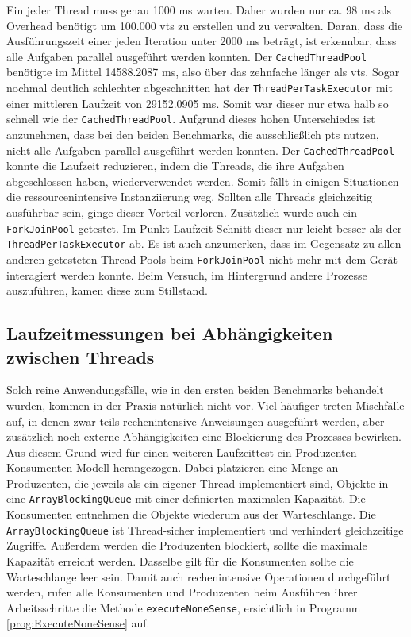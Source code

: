     Ein jeder Thread muss genau
    1000 ms warten. Daher wurden nur ca. 98 ms als Overhead benötigt um 100.000 \Glspl{vt} zu erstellen und zu verwalten. Daran, dass die Ausführungszeit einer jeden Iteration unter 2000 ms beträgt, ist
    erkennbar, dass alle Aufgaben parallel ausgeführt werden konnten.
    Der \texttt{CachedThreadPool} benötigte im Mittel 14588.2087 ms, also über das zehnfache länger als \Glspl{vt}.
    Sogar nochmal deutlich schlechter abgeschnitten hat der \texttt{ThreadPerTaskExecutor} mit einer mittleren Laufzeit von 29152.0905 ms. Somit war dieser nur etwa halb so schnell wie
    der \texttt{CachedThreadPool}. Aufgrund dieses hohen Unterschiedes ist anzunehmen, dass bei den beiden Benchmarks, die ausschließlich \Glspl{pt} nutzen, nicht alle Aufgaben parallel ausgeführt
    werden konnten. Der \texttt{CachedThreadPool} konnte die Laufzeit reduzieren, indem die Threads, die ihre Aufgaben abgeschlossen haben, wiederverwendet werden. Somit fällt in einigen Situationen 
    die ressourcenintensive Instanziierung weg. Sollten alle Threads gleichzeitig ausführbar sein, ginge dieser Vorteil verloren. Zusätzlich wurde auch ein \texttt{ForkJoinPool} getestet. 
    Im Punkt Laufzeit Schnitt dieser nur leicht besser als der \texttt{ThreadPerTaskExecutor} ab. Es ist auch anzumerken, dass 
    im Gegensatz zu allen anderen getesteten Thread-Pools beim \texttt{ForkJoinPool} nicht mehr mit dem Gerät interagiert werden konnte. Beim Versuch, im Hintergrund andere Prozesse auszuführen, kamen diese zum 
    Stillstand. 

\subsection{Laufzeitmessungen bei Abhängigkeiten zwischen Threads}
\label{subsec:LaufzeitmessungenbeiAbhängigkeitenzwischenThreads}

    Solch reine Anwendungsfälle, wie in den ersten beiden Benchmarks behandelt wurden, kommen in der Praxis natürlich nicht vor. Viel häufiger treten Mischfälle auf, in denen zwar teils rechenintensive Anweisungen
    ausgeführt werden,
    aber zusätzlich noch externe Abhängigkeiten eine Blockierung des Prozesses bewirken. Aus diesem Grund wird für einen weiteren Laufzeittest ein Produzenten-Konsumenten Modell herangezogen.
    Dabei platzieren eine Menge an Produzenten, die jeweils als ein eigener Thread implementiert sind, Objekte in eine \texttt{ArrayBlockingQueue} mit einer definierten maximalen Kapazität.
    Die Konsumenten entnehmen die Objekte wiederum aus der Warteschlange. Die \texttt{ArrayBlockingQueue} ist Thread-sicher implementiert und verhindert gleichzeitige Zugriffe. Außerdem werden 
    die Produzenten blockiert, sollte die maximale Kapazität erreicht werden. Dasselbe gilt für die Konsumenten sollte die Warteschlange leer sein. 
    Damit auch rechenintensive Operationen durchgeführt werden, rufen alle Konsumenten und Produzenten beim Ausführen ihrer Arbeitsschritte die Methode \texttt{executeNoneSense}, ersichtlich
    in Programm \ref{prog:ExecuteNoneSense} auf.

